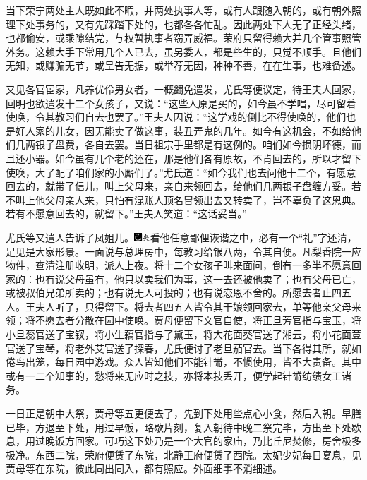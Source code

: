 当下荣宁两处主人既如此不暇，并两处执事人等，或有人跟随入朝的，或有朝外照理下处事务的，又有先踩踏下处的，也都各各忙乱。因此两处下人无了正经头绪，也都偷安，或乘隙结党，与权暂执事者窃弄威福。荣府只留得赖大并几个管事照管外务。这赖大手下常用几个人已去，虽另委人，都是些生的，只觉不顺手。且他们无知，或赚骗无节，或呈告无据，或举荐无因，种种不善，在在生事，也难备述。

又见各官宦家，凡养优伶男女者，一概蠲免遣发，尤氏等便议定，待王夫人回家，回明也欲遣发十二个女孩子，又说：``这些人原是买的，如今虽不学唱，尽可留着使唤，令其教习们自去也罢了。''王夫人因说：``这学戏的倒比不得使唤的，他们也是好人家的儿女，因无能卖了做这事，装丑弄鬼的几年。如今有这机会，不如给他们几两银子盘费，各自去罢。当日祖宗手里都是有这例的。咱们如今损阴坏德，而且还小器。如今虽有几个老的还在，那是他们各有原故，不肯回去的，所以才留下使唤，大了配了咱们家的小厮们了。''尤氏道：``如今我们也去问他十二个，有愿意回去的，就带了信儿，叫上父母来，亲自来领回去，给他们几两银子盘缠方妥。若不叫上他父母亲人来，只怕有混账人顶名冒领出去又转卖了，岂不辜负了这恩典。若有不愿意回去的，就留下。''王夫人笑道：``这话妥当。''

尤氏等又遣人告诉了凤姐儿。{\includegraphics[width=3mm]{../Images/00003}\includegraphics[width=3mm]{../Images/00012}\footnotesize \kaishu 看他任意鄙俚诙谐之中，必有一个``礼''字还清，足见是大家形景。}一面说与总理房中，每教习给银八两，令其自便。凡梨香院一应物件，查清注册收明，派人上夜。将十二个女孩子叫来面问，倒有一多半不愿意回家的：也有说父母虽有，他只以卖我们为事，这一去还被他卖了；也有父母已亡，或被叔伯兄弟所卖的；也有说无人可投的；也有说恋恩不舍的。所愿去者止四五人。王夫人听了，只得留下。将去者四五人皆令其干娘领回家去，单等他亲父母来领；将不愿去者分散在园中使唤。贾母便留下文官自使，将正旦芳官指与宝玉，将小旦蕊官送了宝钗，将小生藕官指与了黛玉，将大花面葵官送了湘云，将小花面荳官送了宝琴，将老外艾官送了探春，尤氏便讨了老旦茄官去。当下各得其所，就如倦鸟出笼，每日园中游戏。众人皆知他们不能针黹，不惯使用，皆不大责备。其中或有一二个知事的，愁将来无应时之技，亦将本技丢开，便学起针黹纺绩女工诸务。

一日正是朝中大祭，贾母等五更便去了，先到下处用些点心小食，然后入朝。早膳已毕，方退至下处，用过早饭，略歇片刻，复入朝待中晚二祭完毕，方出至下处歇息，用过晚饭方回家。可巧这下处乃是一个大官的家庙，乃比丘尼焚修，房舍极多极净。东西二院，荣府便赁了东院，北静王府便赁了西院。太妃少妃每日宴息，见贾母等在东院，彼此同出同入，都有照应。外面细事不消细述。

